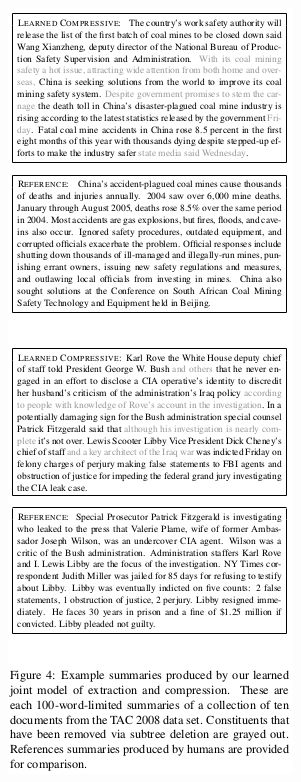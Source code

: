\documentclass[xcolor={table}]{beamer}
\begin{document}
\begin{frame}[t]{\cite{berg2011jointly}}
      \begin{figure}[h]
          \centering
      \includegraphics[scale=.29]{images/figure4-bergkirkpatrick11.png} \\
  \end{figure}
\end{frame}
\end{document}
